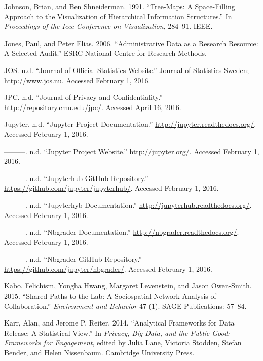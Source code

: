 \documentclass[]{krantz}
\begin{document}
\hypertarget{ref-johnson1991tree}{}
Johnson, Brian, and Ben Shneiderman. 1991. ``Tree-Maps: A Space-Filling
Approach to the Visualization of Hierarchical Information Structures.''
In \emph{Proceedings of the Ieee Conference on Visualization}, 284--91.
IEEE.

\hypertarget{ref-jones2006administrative}{}
Jones, Paul, and Peter Elias. 2006. ``Administrative Data as a Research
Resource: A Selected Audit.'' ESRC National Centre for Research Methods.

\hypertarget{ref-JOSweb}{}
JOS. n.d. ``Journal of Official Statistics Website.'' Journal of
Statistics Sweden; \url{http://www.jos.nu}. Accessed February 1, 2016.

\hypertarget{ref-JPC}{}
JPC. n.d. ``Journal of Privacy and Confidentiality.''
\url{http://repository.cmu.edu/jpc/}. Accessed April 16, 2016.

\hypertarget{ref-juypterdoc}{}
Jupyter. n.d. ``Jupyter Project Documentation.''
\url{http://jupyter.readthedocs.org/}. Accessed February 1, 2016.

\hypertarget{ref-juypter}{}
---------. n.d. ``Jupyter Project Website.'' \url{http://jupyter.org/}.
Accessed February 1, 2016.

\hypertarget{ref-juypterhub}{}
---------. n.d. ``Jupyterhub GitHub Repository.''
\url{https://github.com/jupyter/jupyterhub/}. Accessed February 1, 2016.

\hypertarget{ref-juypterhubdoc}{}
---------. n.d. ``Jupyterhyb Documentation.''
\url{http://jupyterhub.readthedocs.org/}. Accessed February 1, 2016.

\hypertarget{ref-nbgraderdoc}{}
---------. n.d. ``Nbgrader Documentation.''
\url{http://nbgrader.readthedocs.org/}. Accessed February 1, 2016.

\hypertarget{ref-nbgrader}{}
---------. n.d. ``Nbgrader GitHub Repository.''
\url{https://github.com/jupyter/nbgrader/}. Accessed February 1, 2016.

\hypertarget{ref-kabo2015shared}{}
Kabo, Felichism, Yongha Hwang, Margaret Levenstein, and Jason
Owen-Smith. 2015. ``Shared Paths to the Lab: A Sociospatial Network
Analysis of Collaboration.'' \emph{Environment and Behavior} 47 (1).
SAGE Publications: 57--84.

\hypertarget{ref-karr2014analytical}{}
Karr, Alan, and Jerome P. Reiter. 2014. ``Analytical Frameworks for Data
Release: A Statistical View.'' In \emph{Privacy, Big Data, and the
Public Good: Frameworks for Engagement}, edited by Julia Lane, Victoria
Stodden, Stefan Bender, and Helen Nissenbaum. Cambridge University
Press.
\end{document}
